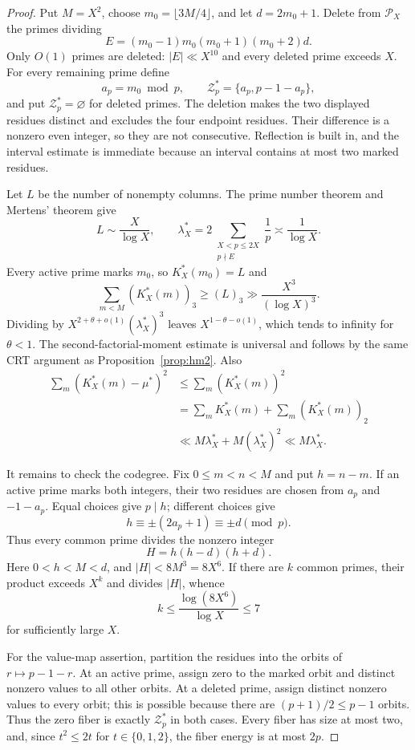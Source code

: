 \begin{proof}
Put $M=X^2$, choose $m_0=\lfloor3M/4\rfloor$, and let $d=2m_0+1$.
Delete from $\mathcal P_X$ the primes dividing
\[
  E=(m_0-1)m_0(m_0+1)(m_0+2)d.
\]
Only $O(1)$ primes are deleted: $|E|\ll X^{10}$ and every deleted prime
exceeds $X$.  For every remaining prime define
\[
  a_p=m_0\bmod p,
  \qquad
  \mathcal Z_p^*=\{a_p,p-1-a_p\},
\]
and put $\mathcal Z_p^*=\varnothing$ for deleted primes.  The deletion
makes the two displayed residues distinct and excludes the four endpoint
residues.  Their difference is a nonzero even integer, so they are not
consecutive.  Reflection is built in, and the interval estimate is
immediate because an interval contains at most two marked residues.

Let $L$ be the number of nonempty columns.  The prime number theorem and
Mertens' theorem give
\[
  L\sim\frac{X}{\log X},
  \qquad
  \lambda_X^*=2\sum_{\substack{X<p\le2X\\p\nmid E}}\frac1p
  \asymp\frac1{\log X}.
\]
Every active prime marks $m_0$, so $K_X^*(m_0)=L$ and
\[
  \sum_{m<M}(K_X^*(m))_3\ge(L)_3
  \gg\frac{X^3}{(\log X)^3}.
\]
Dividing by $X^{2+\theta+o(1)}(\lambda_X^*)^3$ leaves
$X^{1-\theta-o(1)}$, which tends to infinity for $\theta<1$.
The second-factorial-moment estimate is universal and follows by the same
CRT argument as Proposition~\ref{prop:hm2}.  Also
\begin{align*}
  \sum_m(K_X^*(m)-\mu^*)^2
  &\le\sum_m(K_X^*(m))^2\\
  &=\sum_mK_X^*(m)+\sum_m(K_X^*(m))_2\\
  &\ll M\lambda_X^*+M(\lambda_X^*)^2
  \ll M\lambda_X^*.
\end{align*}

It remains to check the codegree.  Fix $0\le m<n<M$ and put $h=n-m$.
If an active prime marks both integers, their two residues are chosen from
$a_p$ and $-1-a_p$.  Equal choices give $p\mid h$; different choices give
\[
  h\equiv\pm(2a_p+1)\equiv\pm d\pmod p.
\]
Thus every common prime divides the nonzero integer
\[
  H=h(h-d)(h+d).
\]
Here $0<h<M<d$, and $|H|<8M^3=8X^6$.  If there are $k$ common primes,
their product exceeds $X^k$ and divides $|H|$, whence
\[
  k\le\frac{\log(8X^6)}{\log X}\le7
\]
for sufficiently large $X$.

For the value-map assertion, partition the residues into the orbits of
$r\mapsto p-1-r$.  At an active prime, assign zero to the marked orbit
and distinct nonzero values to all other orbits.  At a deleted prime,
assign distinct nonzero values to every orbit; this is possible because
there are $(p+1)/2\le p-1$ orbits.  Thus the zero fiber is exactly
$\mathcal Z_p^*$ in both cases.  Every fiber has size at most two, and,
since $t^2\le2t$ for $t\in\{0,1,2\}$, the fiber energy is at most $2p$.


\end{proof}
